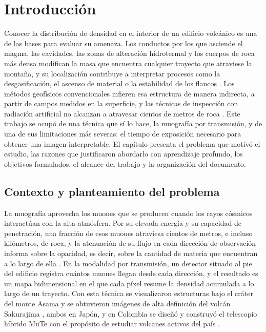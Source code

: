 \chapter{Introducción}
\label{chap:introduccion}


Conocer la distribución de densidad en el interior de un edificio volcánico es una de las bases para evaluar su amenaza. Los conductos por los que asciende el magma, las cavidades, las zonas de alteración hidrotermal y los cuerpos de roca más densa modifican la masa que encuentra cualquier trayecto que atraviese la montaña, y su localización contribuye a interpretar procesos como la desgasificación, el ascenso de material o la estabilidad de los flancos \parencite{tanaka2007asama,tanaka2023muography}. Los métodos geofísicos convencionales infieren esa estructura de manera indirecta, a partir de campos medidos en la superficie, y las técnicas de inspección con radiación artificial no alcanzan a atravesar cientos de metros de roca \parencite{bonomi2020}. Este trabajo se ocupó de una técnica que sí lo hace, la muografía por transmisión, y de una de sus limitaciones más severas: el tiempo de exposición necesario para obtener una imagen interpretable. El capítulo presenta el problema que motivó el estudio, las razones que justificaron abordarlo con aprendizaje profundo, los objetivos formulados, el alcance del trabajo y la organización del documento.

\section{Contexto y planteamiento del problema}
\label{sec:intro-problema}

La muografía aprovecha los muones que se producen cuando los rayos cósmicos interactúan con la alta atmósfera. Por su elevada energía y su capacidad de penetración, una fracción de esos muones atraviesa cientos de metros, e incluso kilómetros, de roca, y la atenuación de su flujo en cada dirección de observación informa sobre la opacidad, es decir, sobre la cantidad de materia que encuentran a lo largo de ella \parencite{bonomi2020,tanaka2023muography}. En la modalidad por transmisión, un detector situado al pie del edificio registra cuántos muones llegan desde cada dirección, y el resultado es un mapa bidimensional en el que cada píxel resume la densidad acumulada a lo largo de un trayecto. Con esta técnica se visualizaron estructuras bajo el cráter del monte Asama \parencite{tanaka2007asama} y se obtuvieron imágenes de alta definición del volcán Sakurajima \parencite{olah2018sakurajima}, ambos en Japón, y en Colombia se diseñó y construyó el telescopio híbrido MuTe con el propósito de estudiar volcanes activos del país \parencite{penarodriguez2020}.

